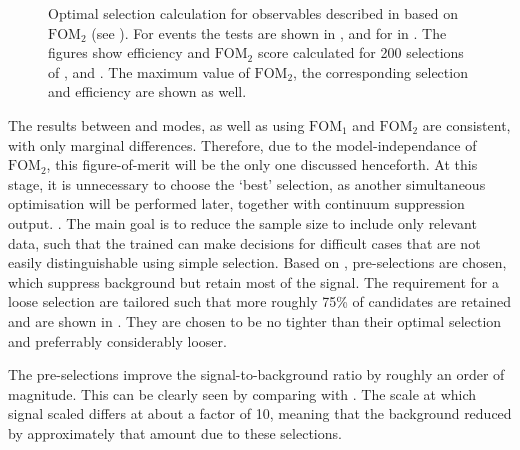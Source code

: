 \begin{figure}[htbp!]
{        }
    \caption{\label{fig:selection_optimisations} Optimal selection calculation for observables
    described in  based on $\mathrm{FOM}_2$ (see ).
    For \BptoXsgamma events the tests are shown
    in ,
    and for \BztoXsgamma in .
    The figures show efficiency and $\mathrm{FOM}_2$ score calculated for 200 selections of \piVeto, \etaVeto and \ZMVA.
    The maximum value of $\mathrm{FOM}_2$, the corresponding selection and efficiency are shown as well.
    }
\end{figure}

The results between \Bp and \Bz modes, as well as using $\mathrm{FOM}_1$ and $\mathrm{FOM}_2$ are consistent, with only marginal differences.
Therefore, due to the model-independance of $\mathrm{FOM}_2$, this figure-of-merit will be the only one discussed henceforth.
At this stage, it is unnecessary to choose the `best' selection, as another simultaneous optimisation will be performed later, together with continuum suppression \BDT output.
. 
The main goal is to reduce the sample size to include only relevant data, such that the trained \BDT can make decisions for difficult cases that are not easily distinguishable using simple selection.
Based on , pre-selections are chosen, which suppress background but retain most of the signal.
The requirement for a loose selection are tailored such that more roughly 75\% of \BtoXsgamma candidates are retained and are shown in .
They are chosen to be no tighter than their optimal selection and preferrably considerably looser.

\begin{table}[htbp!]
    \centering
    \caption{\label{tab:preselections} }
    
\end{table}

The pre-selections improve the signal-to-background ratio by roughly an order of magnitude.
This can be clearly seen by comparing  with .
The scale at which \BtoXsgamma signal \MC scaled differs at about a factor of 10, meaning that the background reduced by approximately that amount due to these selections.


